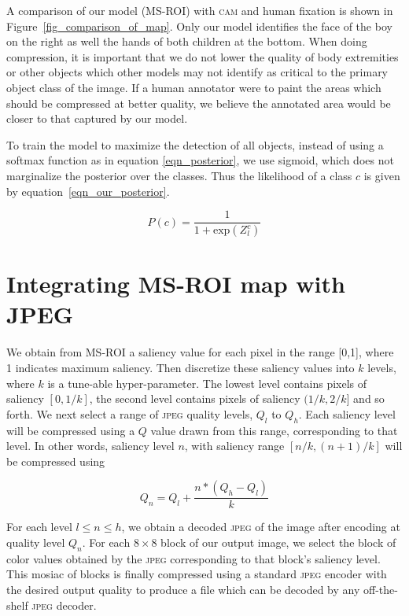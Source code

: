 A comparison of our model (MS-ROI) with \textsc{cam} and human fixation is shown in Figure~\ref{fig_comparison_of_map}. 
Only our model identifies the face of the boy on the right as well the hands of both children at the bottom. 
When doing compression, it is important that we do not lower the quality of body extremities or other objects which other models may not identify as critical to the primary object class of the image.
If a human annotator were to paint the areas which should be compressed at better quality, we believe the annotated area would be closer to that captured by our model.

To train the model to maximize the detection of all objects, instead of using a softmax function as in equation \ref{eqn_posterior}, we use sigmoid, which does not marginalize the posterior over the classes.
Thus the likelihood of a class $c$ is given by equation~\ref{eqn_our_posterior}. 

\begin{equation}
    P(c) = \frac{1}{1 + \text{exp}(Z^c_l)}
    \label{eqn_our_posterior}
\end{equation}

\section{Integrating MS-ROI map with JPEG}
We obtain from MS-ROI a saliency value for each pixel in the range [0,1], where 1 indicates maximum saliency.
Then discretize these saliency values into $k$ levels, where $k$ is a tune-able hyper-parameter.
The lowest level contains pixels of saliency $[0,1/k]$, the second level contains pixels of saliency $(1/k,2/k]$ and so forth.
We next select a range of \textsc{jpeg} quality levels, $Q_l$ to $Q_h$.  Each saliency level will be compressed using a $Q$ value drawn from this range, corresponding to that level.
In other words, saliency level $n$, with saliency range $[n/k,(n+1)/k]$ will be compressed using 

\begin{equation}
Q_n = Q_l + \frac{n*(Q_h - Q_l)}{k}
\end{equation}



For each level $l \le n \le h$, we obtain a decoded \textsc{jpeg} of the image after encoding at quality level $Q_n$.
For each $8 \times 8$ block of our output image, we select the block of color values obtained by the \textsc{jpeg} corresponding to that block's saliency level.  This mosiac of blocks is finally compressed using a standard \textsc{jpeg} encoder with the desired output quality to produce a file which can be decoded by any off-the-shelf \textsc{jpeg} decoder.

